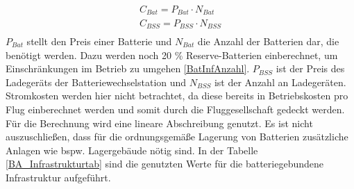 \begin{equation}
   \begin{split}
  {C_{Bat}} = P_{Bat} \cdot N_{Bat}  \\
  {C_{BSS}} = P_{BSS} \cdot N_{BSS} \\
  \label{BA_zusatz}
   \end{split}
  \end{equation}
%
$P_{Bat}$ stellt den Preis einer Batterie und $N_{Bat}$ die Anzahl der Batterien dar, die benötigt werden. 
Dazu werden noch 20 \% Reserve-Batterien einberechnet, um Einschränkungen im Betrieb zu umgehen \eqref{BatInfAnzahl}. 
$P_{BSS}$ ist der Preis des Ladegeräts der Batteriewechselstation und $N_{BSS}$ ist der Anzahl an Ladegeräten. 
Stromkosten werden hier nicht betrachtet, da diese bereits in Betriebskosten 
pro Flug einberechnet werden und somit durch die Fluggesellschaft gedeckt werden. 
Für die Berechnung wird eine lineare Abschreibung genutzt. 
Es ist nicht auszuschließen, dass für die ordnungsgemäße Lagerung 
von Batterien zusätzliche Anlagen wie bspw. Lagergebäude nötig sind. %
In der Tabelle \ref{BA_Infrastrukturtab} sind die genutzten Werte für die batteriegebundene Infrastruktur aufgeführt.
%
%
%
